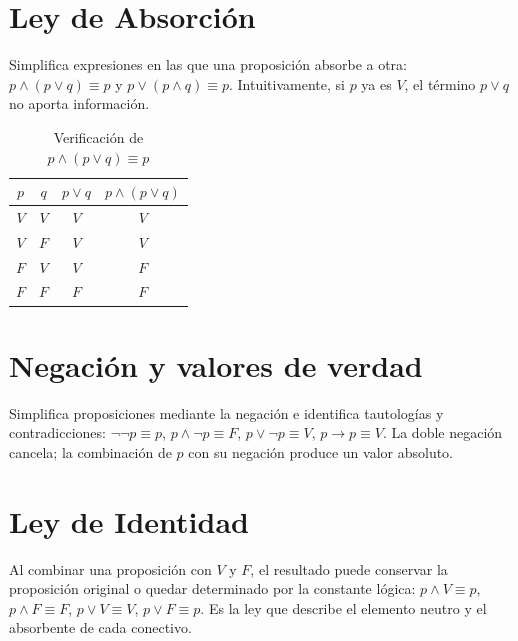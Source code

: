 \documentclass[11pt,a4paper,openany]{book}
\begin{document}
\section{Ley de Absorci\'on}
Simplifica expresiones en las que una proposici\'on absorbe a otra: $p \land (p \lor q) \equiv p$ y $p \lor (p \land q) \equiv p$. Intuitivamente, si $p$ ya es $V$, el t\'ermino $p \lor q$ no aporta informaci\'on.
\begin{table}[H]
\centering
\caption{Verificaci\'on de $p \land (p \lor q) \equiv p$}
\begin{tabular}{cc|c|c}
\toprule
$p$ & $q$ & $p \lor q$ & $p \land (p \lor q)$ \\
\midrule
$V$ & $V$ & $V$ & $V$ \\
$V$ & $F$ & $V$ & $V$ \\
$F$ & $V$ & $V$ & $F$ \\
$F$ & $F$ & $F$ & $F$ \\
\bottomrule
\end{tabular}
\end{table}

\section{Negaci\'on y valores de verdad}
Simplifica proposiciones mediante la negaci\'on e identifica tautolog\'ias y contradicciones: $\lnot\lnot p \equiv p$, $p \land \lnot p \equiv F$, $p \lor \lnot p \equiv V$, $p \to p \equiv V$. La doble negaci\'on cancela; la combinaci\'on de $p$ con su negaci\'on produce un valor absoluto.

\section{Ley de Identidad}
Al combinar una proposici\'on con $V$ y $F$, el resultado puede conservar la proposici\'on original o quedar determinado por la constante l\'ogica: $p \land V \equiv p$, $p \land F \equiv F$, $p \lor V \equiv V$, $p \lor F \equiv p$. Es la ley que describe el elemento neutro y el absorbente de cada conectivo.
\end{document}
